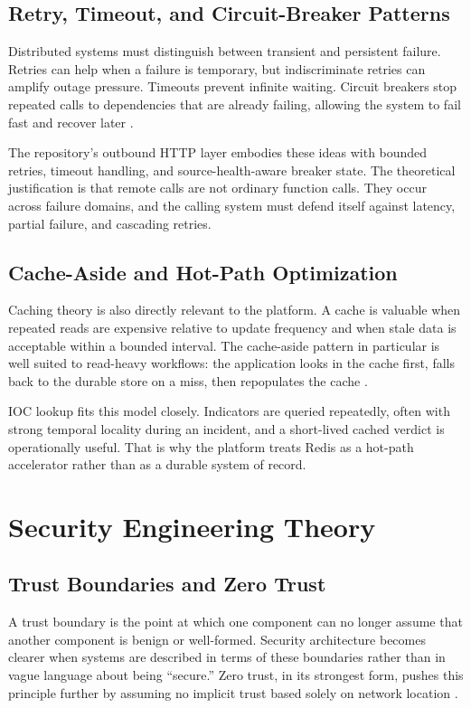 \subsection{Retry, Timeout, and Circuit-Breaker Patterns}
Distributed systems must distinguish between transient and persistent failure. Retries can help when a failure is temporary, but indiscriminate retries can amplify outage pressure. Timeouts prevent infinite waiting. Circuit breakers stop repeated calls to dependencies that are already failing, allowing the system to fail fast and recover later \cite{circuit_breaker_pattern}.

The repository's outbound HTTP layer embodies these ideas with bounded retries, timeout handling, and source-health-aware breaker state. The theoretical justification is that remote calls are not ordinary function calls. They occur across failure domains, and the calling system must defend itself against latency, partial failure, and cascading retries.

\subsection{Cache-Aside and Hot-Path Optimization}
Caching theory is also directly relevant to the platform. A cache is valuable when repeated reads are expensive relative to update frequency and when stale data is acceptable within a bounded interval. The cache-aside pattern in particular is well suited to read-heavy workflows: the application looks in the cache first, falls back to the durable store on a miss, then repopulates the cache \cite{cache_aside_pattern}.

IOC lookup fits this model closely. Indicators are queried repeatedly, often with strong temporal locality during an incident, and a short-lived cached verdict is operationally useful. That is why the platform treats Redis as a hot-path accelerator rather than as a durable system of record.

\section{Security Engineering Theory}
\subsection{Trust Boundaries and Zero Trust}
A trust boundary is the point at which one component can no longer assume that another component is benign or well-formed. Security architecture becomes clearer when systems are described in terms of these boundaries rather than in vague language about being ``secure.'' Zero trust, in its strongest form, pushes this principle further by assuming no implicit trust based solely on network location \cite{nist_zero_trust}.

